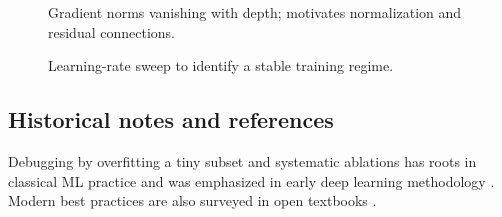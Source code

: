 \begin{figure}[h]
  \centering
  \caption{Gradient norms vanishing with depth; motivates normalization and residual connections.}
  \label{fig:vanishing-grad}
\end{figure}

\begin{figure}[h]
  \centering
  \caption{Learning-rate sweep to identify a stable training regime.}
  \label{fig:lr-sweep}
\end{figure}

\subsection{Historical notes and references}

Debugging by overfitting a tiny subset and systematic ablations has roots in classical ML practice and was emphasized in early deep learning methodology \textcite{GoodfellowEtAl2016}. Modern best practices are also surveyed in open textbooks \textcite{Prince2023,D2LChapterOptimization}.


